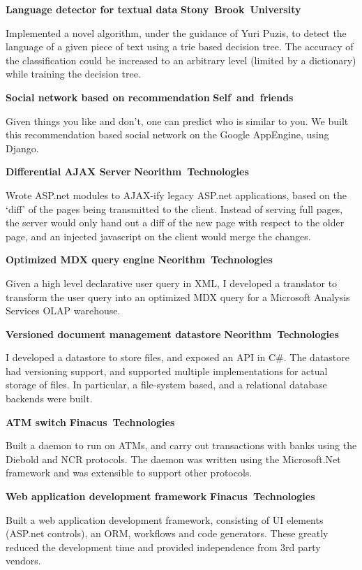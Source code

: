 \documentclass[a4paper,11pt,final]{article}
\newcommand{\projexp}[2]{%
  \vspace{12pt}
  \noindent\textbf{{#1}}
  \hfill
  \hbox{\textbf{{#2}}}
  \\ \vspace{-12pt}
}
\begin{document}
\projexp{Language detector for textual data}{Stony Brook University}

\noindent Implemented a novel algorithm, under the guidance of Yuri
Puzis, to detect the language of a given piece of text using a trie
based decision tree. The accuracy of the classification could be
increased to an arbitrary level (limited by a dictionary) while
training the decision tree.

\projexp{Social network based on recommendation}{Self and friends}

\noindent Given things you like and don't, one can predict who is
similar to you. We built this recommendation based social network on
the Google AppEngine, using Django.

\projexp{Differential AJAX Server}{Neorithm Technologies}

\noindent Wrote ASP.net modules to AJAX-ify legacy ASP.net applications,
based on the `diff' of the pages being transmitted to the
client. Instead of serving full pages, the server would only hand out
a diff of the new page with respect to the older page, and an injected
javascript on the client would merge the changes.

\projexp{Optimized MDX query engine}{Neorithm Technologies}

\noindent Given a high level declarative user query in XML, I developed a
translator to transform the user query into an optimized MDX query for
a Microsoft Analysis Services OLAP warehouse.

\projexp{Versioned document management datastore}{Neorithm Technologies}

\noindent I developed a datastore to store files, and exposed an API
in C\#. The datastore had versioning support, and supported multiple
implementations for actual storage of files. In particular, a
file-system based, and a relational database backends were built.

\projexp{ATM switch}{Finacus Technologies} 

\noindent Built a daemon to run on ATMs, and carry out transactions
with banks using the Diebold and NCR protocols. The daemon was written
using the Microsoft.Net framework and was extensible to support other
protocols.

\projexp{Web application development framework}{Finacus Technologies}

\noindent Built a web application development framework, consisting of
UI elements (ASP.net controls), an ORM, workflows and code
generators. These greatly reduced the development time and provided
independence from 3rd party vendors.
\end{document}
